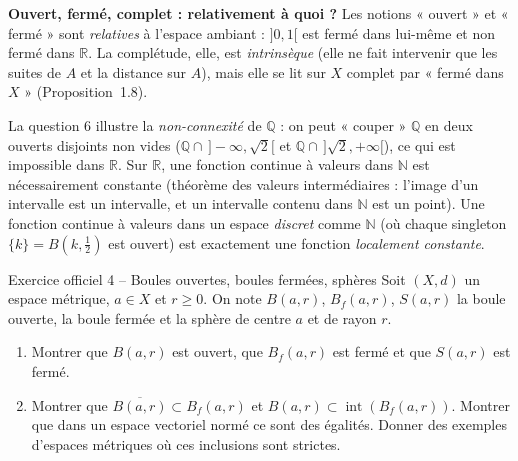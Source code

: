 \documentclass[11pt,a4paper]{article}
\newcommand{\R}{\mathbb{R}}
\newcommand{\N}{\mathbb{N}}
\newcommand{\Q}{\mathbb{Q}}
\newcommand{\adh}[1]{\overline{#1}}
\newcommand{\Int}{\operatorname{int}}
\newcommand{\Bf}{B_f}
\theoremstyle{definition}
\begin{document}
\begin{pointcle}
\textbf{Ouvert, fermé, complet : relativement à quoi ?} Les notions « ouvert » et « fermé » sont \emph{relatives} à l'espace ambiant : $]0,1[$ est fermé dans lui-même et non fermé dans $\R$. La complétude, elle, est \emph{intrinsèque} (elle ne fait intervenir que les suites de $A$ et la distance sur $A$), mais elle se lit sur $X$ complet par « fermé dans $X$ » (Proposition~1.8).
\end{pointcle}

\begin{commentaire}
La question 6 illustre la \emph{non-connexité} de $\Q$ : on peut « couper » $\Q$ en deux ouverts disjoints non vides ($\Q\cap\,]-\infty,\sqrt2[$ et $\Q\cap\,]\sqrt2,+\infty[$), ce qui est impossible dans $\R$. Sur $\R$, une fonction continue à valeurs dans $\N$ est nécessairement constante (théorème des valeurs intermédiaires : l'image d'un intervalle est un intervalle, et un intervalle contenu dans $\N$ est un point). Une fonction continue à valeurs dans un espace \emph{discret} comme $\N$ (où chaque singleton $\{k\}=B(k,\tfrac12)$ est ouvert) est exactement une fonction \emph{localement constante}.
\end{commentaire}

\begin{exo}{Exercice officiel 4 -- Boules ouvertes, boules fermées, sphères}
Soit $(X,d)$ un espace métrique, $a\in X$ et $r\ge0$. On note $B(a,r)$, $\Bf(a,r)$, $S(a,r)$ la boule ouverte, la boule fermée et la sphère de centre $a$ et de rayon $r$.
\begin{enumerate}[label=\alph*)]
  \item Montrer que $B(a,r)$ est ouvert, que $\Bf(a,r)$ est fermé et que $S(a,r)$ est fermé.
  \item Montrer que $\adh{B(a,r)}\subset\Bf(a,r)$ et $B(a,r)\subset\Int(\Bf(a,r))$. Montrer que dans un espace vectoriel normé ce sont des égalités. Donner des exemples d'espaces métriques où ces inclusions sont strictes.
\end{enumerate}
\end{exo}
\end{document}
